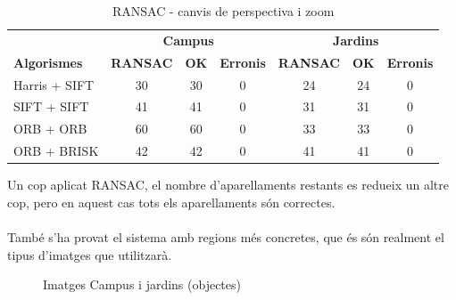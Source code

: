 		\begin{table}[H]
			\begin{center}
				\begin{tabular}{l | c c c | c c c}
					& \multicolumn{3}{c|}{\textbf{Campus}} & \multicolumn{3}{c}{\textbf{Jardins}} \\
					\textbf{Algorismes} & \textbf{RANSAC} & \textbf{OK} & \textbf{Erronis} & \textbf{RANSAC} & \textbf{OK} & \textbf{Erronis} \\ \hline
					Harris + SIFT & 30 & 30 & 0 & 24 & 24 & 0 \\
					SIFT + SIFT & 41 & 41 & 0 & 31 & 31 & 0 \\
					ORB + ORB & 60 & 60 & 0 & 33 & 33 & 0 \\
					ORB + BRISK & 42 & 42 & 0 & 41 & 41 & 0 \\
				\end{tabular}
			\end{center}
			\caption{RANSAC - canvis de perspectiva i zoom}
		\end{table}
		\noindent
		Un cop aplicat RANSAC, el nombre d'aparellaments restants es redueix un altre cop, pero en aquest cas tots els aparellaments són correctes.\\\\
		També s'ha provat el sistema amb regions més concretes, que és són realment el tipus d'imatges que utilitzarà.\\

		\begin{figure}[!htb]
			\caption{Imatges Campus i jardins (objectes)}
		\end{figure}

